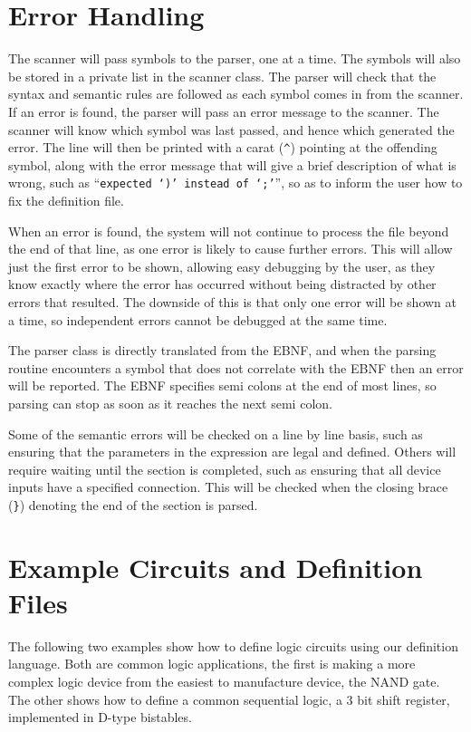 \documentclass[a4paper,11pt]{article}  %
\begin{document}
\section{Error Handling}

The scanner will pass symbols to the parser, one at a time. The
symbols will also be stored in a private list in the scanner
class. The parser will check that the syntax and semantic rules are
followed as each symbol comes in from the scanner. If an error is
found, the parser will pass an error message to the scanner. The
scanner will know which symbol was last passed, and hence which
generated the error. The line will then be printed with a carat
(\verb+^+) pointing at the offending symbol, along with the error
message that will give a brief description of what is wrong, such as
``\texttt{expected `)' instead of `;'}'', so as to inform the user how
to fix the definition file.

When an error is found, the system will not continue to process the
file beyond the end of that line, as one error is likely to cause
further errors. This will allow just the first error to be shown,
allowing easy debugging by the user, as they know exactly where the
error has occurred without being distracted by other errors that
resulted. The downside of this is that only one error will be shown at
a time, so independent errors cannot be debugged at the same time. 

The parser class is directly translated from the EBNF, and when the
parsing routine encounters a symbol that does not correlate with the
EBNF then an error will be reported. The EBNF specifies
semi colons at the end of most lines, so parsing can stop as soon as
it reaches the next semi colon.

Some of the semantic errors will be checked on a line by line basis,
such as ensuring that the parameters in the expression are legal and
defined. Others will require waiting until the section is completed,
such as ensuring that all device inputs have a specified
connection. This will be checked when the closing brace (\verb+}+)
denoting the end of the section is parsed.

\section{Example Circuits and Definition Files}

The following two examples show how to define logic circuits using our
definition language. Both are common logic applications, the first is
making a more complex logic device from the easiest to manufacture
device, the NAND gate. The other shows how to define a common
sequential logic, a 3 bit shift register, implemented in D-type
bistables.
\end{document}
